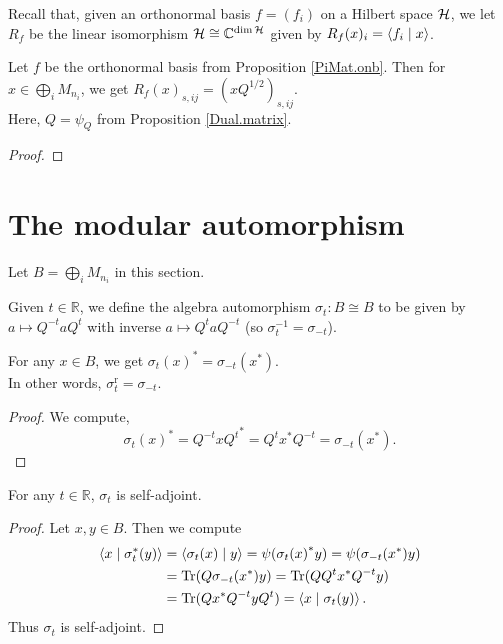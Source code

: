  Recall that, given an orthonormal basis $f=(f_i)$ on a Hilbert space $\mathcal{H}$, we let $R_f$ be the linear isomorphism $\mathcal{H} \cong \mathbb{C}^{\dim\mathcal{H}}$ given by $R_f(x)_i=\left\langle f_i \mid x\right\rangle$.
 \begin{proposition}\label{PiMat.onb_repr}\leanok
  Let $f$ be the orthonormal basis from Proposition \ref{PiMat.onb}.
  Then for $x\in\bigoplus_iM_{n_i}$, we get $R_f(x)_{s,ij}=(xQ^{1/2})_{s,ij}$.\\
  Here, $Q=\psi_Q$ from Proposition \ref{Dual.matrix}.
 \end{proposition}
 \begin{proof}
 \end{proof}

\section{The modular automorphism}
 Let $B=\bigoplus_iM_{n_i}$ in this section.

 \begin{definition}\label{modAut}
  \leanok
  Given $t\in\mathbb{R}$, we define the algebra automorphism $\sigma_t\colon B\cong B$ to be given by $a\mapsto Q^{-t}aQ^{t}$ with inverse $a\mapsto Q^taQ^{-t}$ (so $\sigma_t^{-1}=\sigma_{-t}$).
 \end{definition}

 \begin{proposition}\label{modAut_real_apply}
  \leanok
  For any $x\in B$, we get ${\sigma_{t}(x)}^*=\sigma_{-t}(x^*)$.\\
  In other words, $\sigma_t^{\operatorname{r}}=\sigma_{-t}$.
 \end{proposition}
 \begin{proof}\leanok
  We compute,
  \[{\sigma_{t}(x)}^*={Q^{-t}xQ^t}^*=Q^tx^*Q^{-t}=\sigma_{-t}(x^*).\]
 \end{proof}
 
 \begin{proposition}\label{modAut_isSelfAdjoint}
  \leanok
  For any $t\in\mathbb{R}$, $\sigma_t$ is self-adjoint.
 \end{proposition}
 \begin{proof}\leanok
  Let $x,y\in{B}$. Then we compute
  \begin{align*}
   \left\langle x \mid \sigma_{t}^*(y)\right\rangle &= \left\langle\sigma_{t}(x) \mid y\right\rangle=\psi({\sigma_{t}(x)}^*y)=\psi(\sigma_{-t}(x^*)y)\\
   &=\operatorname{Tr}(Q\sigma_{-t}(x^*)y)=\operatorname{Tr}(QQ^tx^*Q^{-t}y)\\
   &= \operatorname{Tr}(Q x^*Q^{-t}yQ^t)=\left\langle x \mid \sigma_{t}(y)\right\rangle.
  \end{align*}
  Thus $\sigma_{t}$ is self-adjoint.
 \end{proof}

